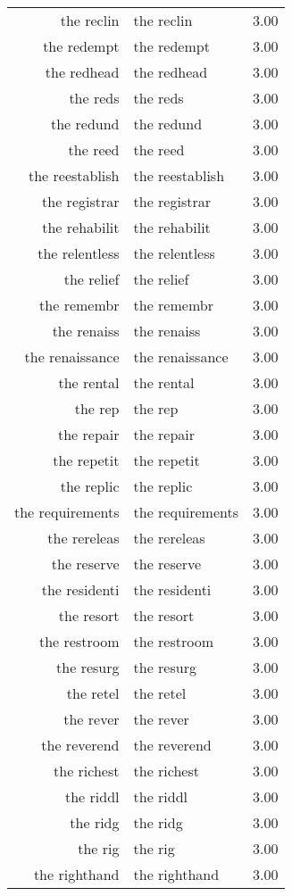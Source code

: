 \begin{table}[ht]
\begin{tabular}{rlr}
  the reclin & the reclin & 3.00 \\ 
  the redempt & the redempt & 3.00 \\ 
  the redhead & the redhead & 3.00 \\ 
  the reds & the reds & 3.00 \\ 
  the redund & the redund & 3.00 \\ 
  the reed & the reed & 3.00 \\ 
  the reestablish & the reestablish & 3.00 \\ 
  the registrar & the registrar & 3.00 \\ 
  the rehabilit & the rehabilit & 3.00 \\ 
  the relentless & the relentless & 3.00 \\ 
  the relief & the relief & 3.00 \\ 
  the remembr & the remembr & 3.00 \\ 
  the renaiss & the renaiss & 3.00 \\ 
  the renaissance & the renaissance & 3.00 \\ 
  the rental & the rental & 3.00 \\ 
  the rep & the rep & 3.00 \\ 
  the repair & the repair & 3.00 \\ 
  the repetit & the repetit & 3.00 \\ 
  the replic & the replic & 3.00 \\ 
  the requirements & the requirements & 3.00 \\ 
  the rereleas & the rereleas & 3.00 \\ 
  the reserve & the reserve & 3.00 \\ 
  the residenti & the residenti & 3.00 \\ 
  the resort & the resort & 3.00 \\ 
  the restroom & the restroom & 3.00 \\ 
  the resurg & the resurg & 3.00 \\ 
  the retel & the retel & 3.00 \\ 
  the rever & the rever & 3.00 \\ 
  the reverend & the reverend & 3.00 \\ 
  the richest & the richest & 3.00 \\ 
  the riddl & the riddl & 3.00 \\ 
  the ridg & the ridg & 3.00 \\ 
  the rig & the rig & 3.00 \\ 
  the righthand & the righthand & 3.00 \\ 

\end{tabular}
\end{table}
